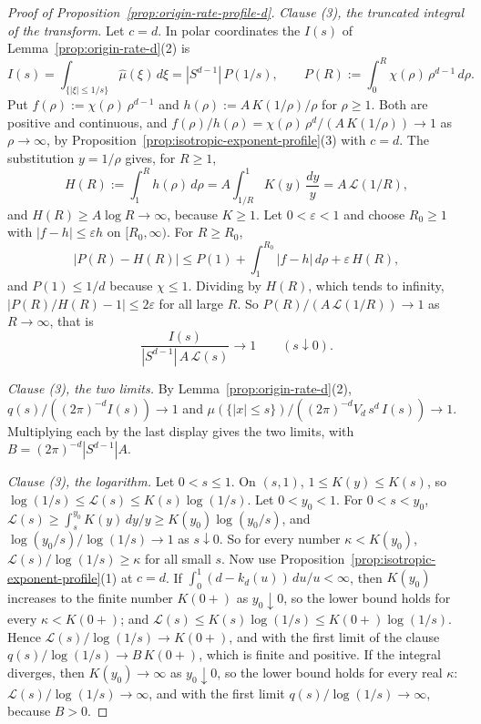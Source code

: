 \begin{proof}[Proof of Proposition~\ref{prop:origin-rate-profile-d}]
\emph{Clause (3), the truncated integral of the transform.} Let $c = d$. In polar coordinates the
$I(s)$ of Lemma~\ref{prop:origin-rate-d}(2) is
\[
  I(s) = \int_{\{|\xi| \le 1/s\}}\widehat\mu(\xi)\,d\xi = |S^{d-1}|\,P(1/s), \qquad
  P(R) := \int_0^R \chi(\rho)\,\rho^{d-1}\,d\rho .
\]
Put $f(\rho) := \chi(\rho)\,\rho^{d-1}$ and $h(\rho) := A\,K(1/\rho)/\rho$ for $\rho \ge 1$. Both
are positive and continuous, and $f(\rho)/h(\rho) = \chi(\rho)\,\rho^{d}/(A\,K(1/\rho)) \to 1$
as $\rho \to \infty$, by Proposition~\ref{prop:isotropic-exponent-profile}(3) with $c = d$. The substitution
$y = 1/\rho$ gives, for $R \ge 1$,
\[
  H(R) := \int_1^R h(\rho)\,d\rho = A\int_{1/R}^{1}K(y)\,\frac{dy}{y} = A\,\mathcal{L}(1/R) ,
\]
and $H(R) \ge A\log R \to \infty$, because $K \ge 1$. Let $0 < \varepsilon < 1$ and choose
$R_0 \ge 1$ with $|f - h| \le \varepsilon h$ on $[R_0,\infty)$. For $R \ge R_0$,
\[
  \bigl|P(R) - H(R)\bigr| \le P(1) + \int_1^{R_0}|f - h|\,d\rho + \varepsilon\,H(R) ,
\]
and $P(1) \le 1/d$ because $\chi \le 1$. Dividing by $H(R)$, which tends to infinity,
$|P(R)/H(R) - 1| \le 2\varepsilon$ for all large $R$. So $P(R)/(A\,\mathcal{L}(1/R)) \to 1$ as
$R \to \infty$, that is
\[
  \frac{I(s)}{|S^{d-1}|\,A\,\mathcal{L}(s)} \to 1 \qquad (s \downarrow 0) .
\]

\emph{Clause (3), the two limits.} By Lemma~\ref{prop:origin-rate-d}(2),
$q(s)/((2\pi)^{-d}I(s)) \to 1$ and $\mu(\{|x| \le s\})/((2\pi)^{-d}V_d\,s^{d}\,I(s)) \to 1$.
Multiplying each by the last display gives the two limits, with
$B = (2\pi)^{-d}|S^{d-1}|A$.

\emph{Clause (3), the logarithm.} Let $0 < s \le 1$. On $(s,1)$, $1 \le K(y) \le K(s)$, so
$\log(1/s) \le \mathcal{L}(s) \le K(s)\log(1/s)$. Let $0 < y_0 < 1$. For $0 < s < y_0$,
$\mathcal{L}(s) \ge \int_s^{y_0}K(y)\,dy/y \ge K(y_0)\log(y_0/s)$, and
$\log(y_0/s)/\log(1/s) \to 1$ as $s \downarrow 0$. So for every number $\kappa < K(y_0)$,
$\mathcal{L}(s)/\log(1/s) \ge \kappa$ for all small $s$. Now use
Proposition~\ref{prop:isotropic-exponent-profile}(1) at $c = d$. If $\int_0^1(d - k_d(u))\,du/u < \infty$,
then $K(y_0)$ increases to the finite number $K(0{+})$ as $y_0 \downarrow 0$, so the lower bound
holds for every $\kappa < K(0{+})$; and $\mathcal{L}(s) \le K(s)\log(1/s) \le K(0{+})\log(1/s)$.
Hence $\mathcal{L}(s)/\log(1/s) \to K(0{+})$, and with the first limit of the clause
$q(s)/\log(1/s) \to B\,K(0{+})$, which is finite and positive. If the integral diverges, then
$K(y_0) \to \infty$ as $y_0 \downarrow 0$, so the lower bound holds for every real $\kappa$:
$\mathcal{L}(s)/\log(1/s) \to \infty$, and with the first limit $q(s)/\log(1/s) \to \infty$,
because $B > 0$.
\end{proof}


